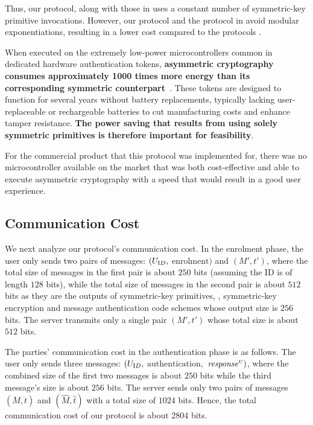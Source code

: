 Thus,  our protocol, along with those in \cite{WangW18,JareckiJKSS21,MatsuoMY11} uses a constant number of symmetric-key primitive invocations. However, our protocol and the protocol in \cite{MatsuoMY11} avoid modular exponentiations, resulting in a lower cost compared to the protocols  \cite{WangW18,JareckiJKSS21}.

When executed on the extremely low-power microcontrollers common in dedicated hardware authentication tokens, \textbf{asymmetric cryptography consumes approximately 1000 times more energy than its corresponding symmetric counterpart}~\cite{energyconsumption}. These tokens are designed to function for several years without battery replacements, typically lacking user-replaceable or rechargeable batteries to cut manufacturing costs and enhance tamper resistance. \textbf{The power saving that results from using solely symmetric primitives is therefore important for feasibility}. 

For the commercial product that this protocol was implemented for, there was no microcontroller available on the market that was both cost-effective and able to execute asymmetric cryptography with a speed that would result in a good user experience.

\subsection{Communication Cost}


We next analyze our protocol's communication cost. In the enrolment phase,  the user only sends two pairs of messages: $(U_{\text ID}, $ $\text{enrolment})$ and $(M', t')$, where the total size of messages in the first pair is about $250$ bits (assuming the ID is of length $128$ bits),  while the total size of messages in the second pair is about  $512$ bits as they are the outputs of symmetric-key primitives, \ie, symmetric-key encryption and message authentication code schemes whose output size is $256$ bits. The server transmits only a single pair $(M', t')$ whose total size is about $512$ bits. 

The parties' communication cost in the authentication phase is as follows. The user only sends three messages: $(U_{\text ID}, $ $\text{authentication}, $ $\mathit{response}^{\scriptscriptstyle U})$, where the combined size of the first two messages is about $250$ bits while the third message's size is about $256$ bits. The server sends only two pairs of messages $(\ddot M, \ddot t)$ and $(\hat M, \hat t)$ with a total size of $1024$ bits. Hence, the total communication cost of our protocol is about $2804$ bits. 

